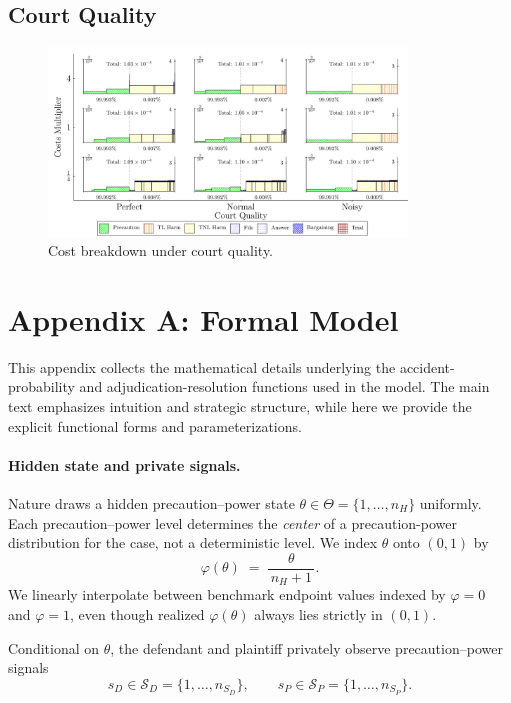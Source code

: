 \documentclass{article}
\begin{document}
\subsection{Court Quality}
\begin{figure}[ht]
  \centering
  \includegraphics[width=0.85\textwidth]{../Figures/Cost Breakdown Court Quality (All Rows).pdf}
  \caption{Cost breakdown under court quality.}
  \label{fig:court_quality}
\end{figure}


\section*{Appendix A: Formal Model}

This appendix collects the mathematical details underlying the accident-probability and adjudication-resolution functions used in the model. The main text emphasizes intuition and strategic structure, while here we provide the explicit functional forms and parameterizations.

\paragraph{Hidden state and private signals.}
Nature draws a hidden precaution–power state $\theta\in\Theta=\{1,\dots,n_H\}$ uniformly. Each precaution–power level determines the \emph{center} of a precaution-power distribution for the case, not a deterministic level. We index $\theta$ onto $(0,1)$ by
\[
\varphi(\theta)\;=\;\frac{\theta}{\,n_H+1\,}.
\]
We linearly interpolate between benchmark endpoint values indexed by $\varphi=0$ and $\varphi=1$, even though realized $\varphi(\theta)$ always lies strictly in $(0,1)$.

Conditional on $\theta$, the defendant and plaintiff privately observe precaution–power signals
\[
s_D\in\mathcal{S}_D=\{1,\dots,n_{S_D}\},\qquad
s_P\in\mathcal{S}_P=\{1,\dots,n_{S_P}\}.
\]
\end{document}
